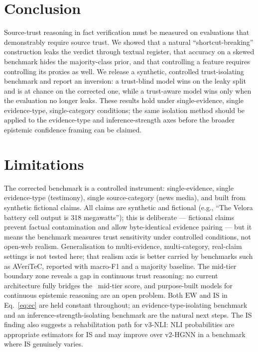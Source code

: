 \documentclass[11pt]{article}
\begin{document}
\section{Conclusion}
Source-trust reasoning in fact verification must be measured on evaluations that demonstrably require source trust. We showed that a natural ``shortcut-breaking'' construction leaks the verdict through textual register, that accuracy on a skewed benchmark hides the majority-class prior, and that controlling a feature requires controlling its proxies as well. We release a synthetic, controlled trust-isolating benchmark and report an inversion: a trust-blind model wins on the leaky split and is at chance on the corrected one, while a trust-aware model wins only when the evaluation no longer leaks. These results hold under single-evidence, single evidence-type, single-category conditions; the same isolation method should be applied to the evidence-type and inference-strength axes before the broader epistemic confidence framing can be claimed.

\section{Limitations}
The corrected benchmark is a controlled instrument: single-evidence, single evidence-type (testimony), single source-category (news media), and built from synthetic fictional claims. All claims are synthetic and fictional (e.g., ``The Velora battery cell output is 318 megawatts''); this is deliberate --- fictional claims prevent factual contamination and allow byte-identical evidence pairing --- but it means the benchmark measures trust sensitivity under controlled conditions, not open-web realism. Generalisation to multi-evidence, multi-category, real-claim settings is not tested here; that realism axis is better carried by benchmarks such as AVeriTeC, reported with macro-F1 and a majority baseline. The mid-tier boundary zone reveals a gap in continuous trust reasoning: no current architecture fully bridges the \MidTierMF\ mid-tier score, and purpose-built models for continuous epistemic reasoning are an open problem. Both $\mathrm{EW}$ and $\mathrm{IS}$ in Eq.~\eqref{eq:ec} are held constant throughout; an evidence-type-isolating benchmark and an inference-strength-isolating benchmark are the natural next steps. The IS finding also suggests a rehabilitation path for v3-NLI: NLI probabilities are appropriate estimators for IS and may improve over v2-HGNN in a benchmark where IS genuinely varies.


\end{document}
